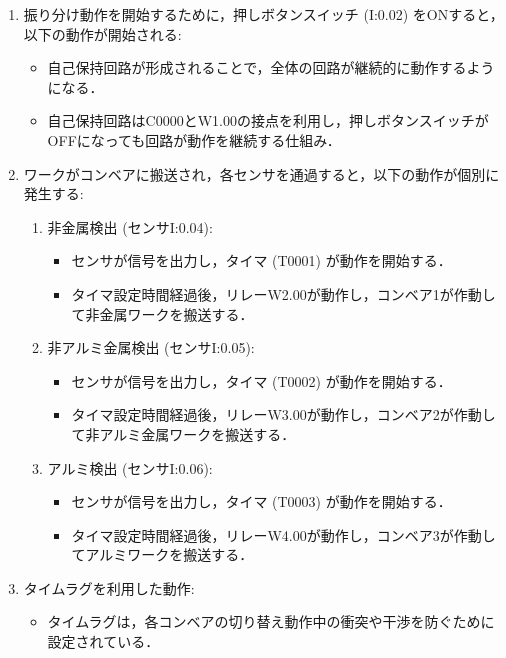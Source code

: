\begin{enumerate}
  \item 振り分け動作を開始するために，押しボタンスイッチ (I:0.02) をONすると，以下の動作が開始される:
        \begin{itemize}
          \item 自己保持回路が形成されることで，全体の回路が継続的に動作するようになる．
          \item 自己保持回路はC0000とW1.00の接点を利用し，押しボタンスイッチがOFFになっても回路が動作を継続する仕組み．
        \end{itemize}
  \item ワークがコンベアに搬送され，各センサを通過すると，以下の動作が個別に発生する:
        \begin{enumerate}
          \item 非金属検出 (センサI:0.04):
                \begin{itemize}
                  \item センサが信号を出力し，タイマ (T0001) が動作を開始する．
                  \item タイマ設定時間経過後，リレーW2.00が動作し，コンベア1が作動して非金属ワークを搬送する．
                \end{itemize}
          \item 非アルミ金属検出 (センサI:0.05):
                \begin{itemize}
                  \item センサが信号を出力し，タイマ (T0002) が動作を開始する．
                  \item タイマ設定時間経過後，リレーW3.00が動作し，コンベア2が作動して非アルミ金属ワークを搬送する．
                \end{itemize}
          \item アルミ検出 (センサI:0.06):
                \begin{itemize}
                  \item センサが信号を出力し，タイマ (T0003) が動作を開始する．
                  \item タイマ設定時間経過後，リレーW4.00が動作し，コンベア3が作動してアルミワークを搬送する．
                \end{itemize}
        \end{enumerate}
  \item タイムラグを利用した動作:
        \begin{itemize}
          \item タイムラグは，各コンベアの切り替え動作中の衝突や干渉を防ぐために設定されている．

\end{itemize}
\end{enumerate}
